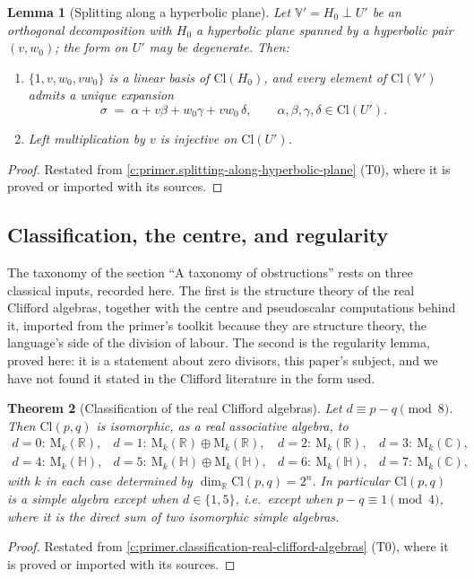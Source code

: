 \documentclass[11pt]{article}
\newtheorem{theorem}{Theorem}[section]
\newtheorem{lemma}[theorem]{Lemma}
\theoremstyle{definition}
\theoremstyle{plain}
\newcommand{\changedmark}[2]{\marginpar{\raggedright\scriptsize\color{#1}#2}}
\providecommand{\C}{}\renewcommand{\C}{\mathbb{C}}
\providecommand{\Cl}{}\renewcommand{\Cl}{\mathrm{Cl}}
\providecommand{\HH}{}\renewcommand{\HH}{\mathbb{H}}
\providecommand{\Mat}{}\renewcommand{\Mat}{\mathrm{M}}
\providecommand{\R}{}\renewcommand{\R}{\mathbb{R}}
\begin{document}
\begin{lemma}[Splitting along a hyperbolic plane]\label{c:transport.splitting-along-hyperbolic-plane}
\changedmark{gray}{reworded}
Let $\mathbb{V}' = H_0 \perp U'$ be an orthogonal decomposition with $H_0$ a hyperbolic plane spanned by a hyperbolic pair $(v, w_0)$; the form on $U'$ may be degenerate. Then:
\begin{enumerate}
\item $\{1, v, w_0, v w_0\}$ is a linear basis of $\Cl(H_0)$, and every element of $\Cl(\mathbb{V}')$ admits a \emph{unique} expansion
\[
\sigma \;=\; \alpha + v\beta + w_0\gamma + v w_0\,\delta, \qquad \alpha, \beta, \gamma, \delta \in \Cl(U').
\]
\item Left multiplication by $v$ is injective on $\Cl(U')$.
\end{enumerate}
\end{lemma}
\begin{proof}
Restated from \ref{c:primer.splitting-along-hyperbolic-plane} (T0), where it is proved or imported with its sources.

\end{proof}

\subsection*{Classification, the centre, and regularity}
\label{c:note.transport.setting-classification-centre-regularity}
The taxonomy of the section ``A taxonomy of obstructions'' rests on three classical inputs, recorded here. The first is the structure theory of the real Clifford algebras, together with the centre and pseudoscalar computations behind it, imported from the primer's toolkit because they are structure theory, the language's side of the division of labour. The second is the regularity lemma, proved here: it is a statement about zero divisors, this paper's subject, and we have not found it stated in the Clifford literature in the form used.

\begin{theorem}[Classification of the real Clifford algebras]\label{c:transport.classification-real-clifford-algebras}
\changedmark{gray}{reworded}
Let $d \equiv p - q \pmod 8$. Then $\Cl(p,q)$ is isomorphic, as a real associative algebra, to
\[
\begin{array}{llll}
d = 0:\ \Mat_{k}(\R), &
d = 1:\ \Mat_{k}(\R) \oplus \Mat_{k}(\R), &
d = 2:\ \Mat_{k}(\R), &
d = 3:\ \Mat_{k}(\C), \\[2pt]
d = 4:\ \Mat_{k}(\HH), &
d = 5:\ \Mat_{k}(\HH) \oplus \Mat_{k}(\HH), &
d = 6:\ \Mat_{k}(\HH), &
d = 7:\ \Mat_{k}(\C),
\end{array}
\]
with $k$ in each case determined by $\dim_\R \Cl(p,q) = 2^n$. In particular $\Cl(p,q)$ is a simple algebra except when $d \in \{1, 5\}$, i.e.\ except when $p - q \equiv 1 \pmod 4$, where it is the direct sum of two isomorphic simple algebras.
\end{theorem}
\begin{proof}
Restated from \ref{c:primer.classification-real-clifford-algebras} (T0), where it is proved or imported with its sources.

\end{proof}
\end{document}
